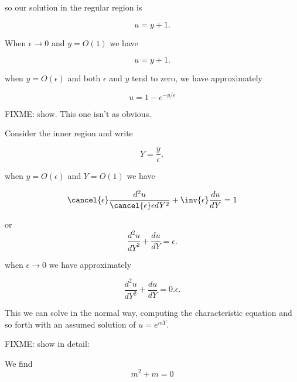 so our solution in the regular region is

\begin{equation}\label{eqn:continuumL20:n}
u = y + 1.
\end{equation}


When $\epsilon \rightarrow 0$ and $y = O(1)$ we have

\begin{equation}\label{eqn:continuumL20:330}
u = y + 1.
\end{equation}

when $y = O(\epsilon)$ and both $\epsilon$ and $y$ tend to zero, we have approximately

\begin{equation}\label{eqn:continuumL20:350}
u = 1 - e^{-y/\epsilon}
\end{equation}

FIXME: show.  This one isn't as obvious.

Consider the inner region and write

\begin{equation}\label{eqn:continuumL20:n}
Y = \frac{y}{\epsilon},
\end{equation}

when $y = O(\epsilon)$ and $Y = O(1)$ we have

\begin{equation}\label{eqn:continuumL20:n}
\cancel{\epsilon} \frac{d^2 u}{\cancel{\epsilon} \epsilon dY^2} + \inv{\epsilon} \frac{du}{dY} = 1
\end{equation}

or
\begin{equation}\label{eqn:continuumL20:n}
\frac{d^2 u}{dY^2} + \frac{du}{dY} = \epsilon.
\end{equation}

when $\epsilon \rightarrow 0$ we have approximately

\begin{equation}\label{eqn:continuumL20:n}
\frac{d^2 u}{dY^2} + \frac{du}{dY} = 0.
\epsilon.
\end{equation}

This we can solve in the normal way, computing the characteristic equation and so forth with an assumed solution of $u = e^{mY}$.

FIXME: show in detail:

We find
\begin{equation}\label{eqn:continuumL20:n}
m^2 + m = 0
\end{equation}

